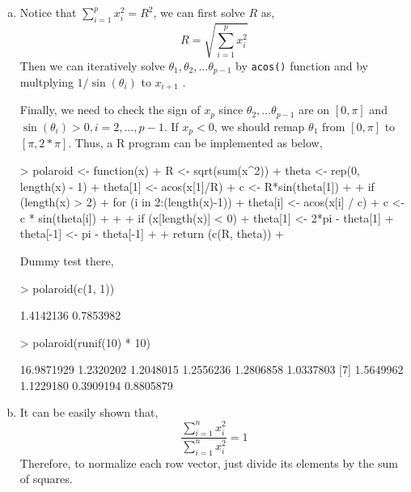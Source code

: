 \documentclass{article}
\begin{document}
\section{}
\begin{enumerate}[(a)]
    \item Notice that $\sum_{i=1}^p x_i^2 = R^2$, we can first solve $R$ as,
        \[
        R = \sqrt{\sum_{i=1}^p x_i^2}
        \]
        Then we can iteratively solve $\theta_1, \theta_2, \dots \theta_{p-1}$
        by \verb=acos()= function and by multplying $1/\sin(\theta_i)$ to
        $x_{i+1}$ .

        Finally, we need to check the sign of $x_p$ since $\theta_2, \dots \theta_{p-1}$ are on $[0, \pi]$ and
        $\sin(\theta_i) > 0, i = 2, \dots, p-1$. If $x_p < 0$, we should remap $\theta_1$ from $[0, \pi]$ to $[\pi, 2*\pi]$.
        Thus, a R program can be implemented as below,
\begin{Schunk}
\begin{Sinput}
> polaroid <- function(x){
+     R <- sqrt(sum(x^2))
+     theta <- rep(0, length(x) - 1)
+     theta[1] <- acos(x[1]/R)
+     c <- R*sin(theta[1])
+ 
+     if (length(x) > 2){
+         for (i in 2:(length(x)-1)){
+             theta[i] <- acos(x[i] / c)    
+             c <- c * sin(theta[i])
+         }
+     }
+     if (x[length(x)] < 0){
+         theta[1] <- 2*pi - theta[1]
+         theta[-1] <- pi - theta[-1]
+     }
+     return (c(R, theta))
+ }
\end{Sinput}
\end{Schunk}
    Dummy test there,
\begin{Schunk}
\begin{Sinput}
> polaroid(c(1, 1))
\end{Sinput}
\begin{Soutput}
[1] 1.4142136 0.7853982
\end{Soutput}
\begin{Sinput}
> polaroid(runif(10) * 10)
\end{Sinput}
\begin{Soutput}
 [1] 16.9871929  1.2320202  1.2048015  1.2556236  1.2806858  1.0337803
 [7]  1.5649962  1.1229180  0.3909194  0.8805879
\end{Soutput}
\end{Schunk}
    \item It can be easily shown that, 
        \[
        \frac{\sum_{i=1}^n x_i^2}{\sum_{i=1}^n x_i^2} = 1
        \]
        Therefore, to normalize each row vector, just divide its elements by the sum of squares. 

\end{enumerate}
\end{document}
